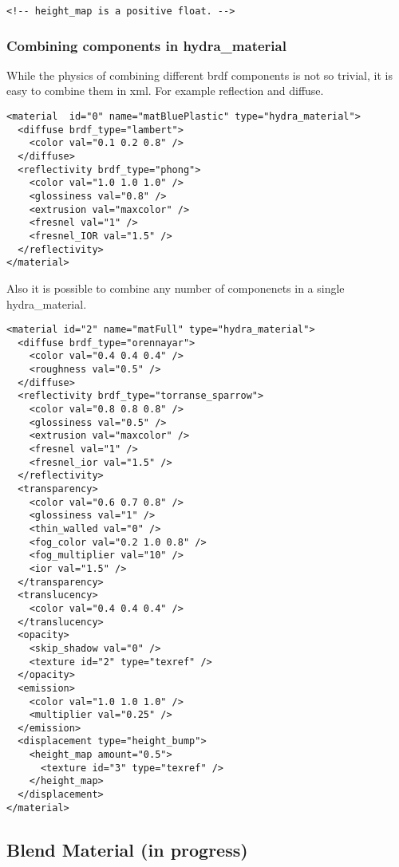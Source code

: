 \documentclass[a4paper,11pt]{report}
\begin{document}
\lstset{language=XML}
\begin{lstlisting}
<!-- height_map is a positive float. -->
\end{lstlisting}


\subsubsection{Combining components in hydra\_material}

While the physics of combining different brdf components is not so trivial, it is easy to combine them in xml. For example reflection and diffuse.

\lstset{language=XML}
\begin{lstlisting}
<material  id="0" name="matBluePlastic" type="hydra_material">
  <diffuse brdf_type="lambert">
    <color val="0.1 0.2 0.8" />
  </diffuse>
  <reflectivity brdf_type="phong">
    <color val="1.0 1.0 1.0" />
    <glossiness val="0.8" />
    <extrusion val="maxcolor" />
    <fresnel val="1" />
    <fresnel_IOR val="1.5" />
  </reflectivity>
</material>
\end{lstlisting}

Also it is possible to combine any number of componenets in a single hydra\_material.

\lstset{language=XML}
\begin{lstlisting}
<material id="2" name="matFull" type="hydra_material">
  <diffuse brdf_type="orennayar">
    <color val="0.4 0.4 0.4" />
    <roughness val="0.5" />
  </diffuse>
  <reflectivity brdf_type="torranse_sparrow">
    <color val="0.8 0.8 0.8" />
    <glossiness val="0.5" />
    <extrusion val="maxcolor" />
    <fresnel val="1" />
    <fresnel_ior val="1.5" />
  </reflectivity>
  <transparency>
    <color val="0.6 0.7 0.8" />
    <glossiness val="1" />
    <thin_walled val="0" />
    <fog_color val="0.2 1.0 0.8" />
    <fog_multiplier val="10" />
    <ior val="1.5" />
  </transparency>  
  <translucency>
    <color val="0.4 0.4 0.4" />
  </translucency>
  <opacity>
    <skip_shadow val="0" />
    <texture id="2" type="texref" />
  </opacity>
  <emission>
    <color val="1.0 1.0 1.0" />
    <multiplier val="0.25" />
  </emission>
  <displacement type="height_bump">
    <height_map amount="0.5">
      <texture id="3" type="texref" />
    </height_map>
  </displacement>  
</material>

\end{lstlisting}

\subsection{Blend Material (in progress)}
\end{document}
